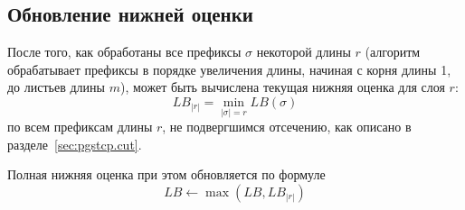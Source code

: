 
\subsection{Обновление нижней оценки}
\label{sec:pgstcp.upd}

После того, как
обработаны все префиксы
$\sigma$
некоторой длины $r$
(алгоритм обрабатывает
префиксы в порядке увеличения длины,
начиная с корня длины 1,
до листьев длины $m$),
может быть вычислена текущая
нижняя оценка для слоя $r$:
\begin{equation}
  \label{eq:pcgtsp.lb.layer}
  LB_{|r|}=\min_{|\sigma|=r} LB(\sigma)
\end{equation}
по всем префиксам длины $r$,
не подвергшимся отсечению,
как описано в разделе~\ref{sec:pgstcp.cut}.

Полная нижняя оценка при этом обновляется по формуле
\begin{equation}
  \label{eq:pcgtsp.lb.total}
  LB \gets \max(LB, LB_{|r|})
\end{equation}
